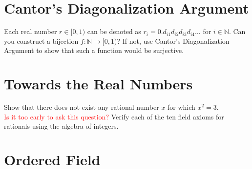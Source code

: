 \documentclass[12pt]{exam}
\begin{document}
\section{Cantor's Diagonalization Argument}
\begin{questions}
\question Each real number $r \in [0,1)$ can be denoted as $r_i = 0.d_{i1}d_{i2}d_{i3}d_{i4}\ldots$ for $i \in \mathbb{N}$. Can you construct a bijection $f : \mathbb{N} \to [0,1)$? If not, use Cantor's Diagonalization Argument to show that such a function would be surjective.
\end{questions}
\section{Towards the Real Numbers}
\begin{questions}
    \question Show that there does not exist any rational number $x$ for which $x^2 = 3$.\\
    \textcolor{red}{Is it too early to ask this question?}
    \question Verify each of the ten field axioms for rationals using the algebra of integers.
\end{questions}
\section{Ordered Field}
\begin{questions}
    \question
\end{questions}
\begin{solution}
\end{solution}
\end{document}
